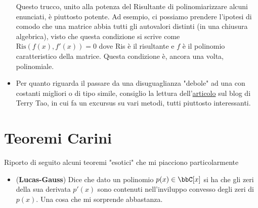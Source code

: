 \documentclass[a4paper,NoNotes,GeneralMath]{stdmdoc}
\theoremstyle{definition}
\begin{document}
\begin{itemize}
		Questo trucco, unito alla potenza del Risultante di polinomiarizzare alcuni enunciati, è piuttosto potente. Ad esempio, ci possiamo prendere l'ipotesi di comodo che una matrice abbia tutti gli autovalori distinti (in una chiusura algebrica), visto che questa condizione si scrive come $\text{Ris}(f(x), f'(x)) = 0$ dove Ris è il risultante e $f$ è il polinomio caratteristico della matrice. Questa condizione è, ancora una volta, polinomiale.
		\item Per quanto riguarda il passare da una disuguaglianza "debole" ad una con costanti migliori o di tipo simile, consiglio la lettura dell'\href{https://terrytao.wordpress.com/2007/09/05/amplification-arbitrage-and-the-tensor-power-trick/}{articolo} sul blog di Terry Tao, in cui fa un excursus su vari metodi, tutti piuttosto interessanti.
	\end{itemize}
	
	\section {Teoremi Carini}
	Riporto di seguito alcuni teoremi "esotici" che mi piacciono particolarmente
	\begin{itemize}
		\item ({\bf Lucas-Gauss}) Dice che dato un polinomio $p(x) \in \bbC[x]$ si ha che gli zeri della sua derivata $p'(x)$ sono contenuti nell'inviluppo convesso degli zeri di $p(x)$. Una cosa che mi sorprende abbastanza.
	\end{itemize}
\end{document}
